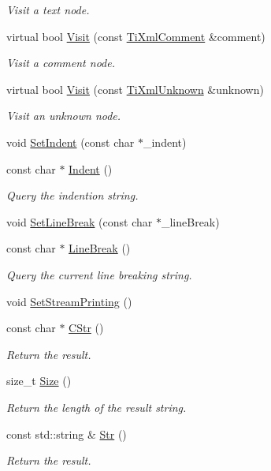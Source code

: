 \begin{DoxyCompactItemize}
\begin{DoxyCompactList}\small\item\em Visit a text node. \end{DoxyCompactList}\item 
virtual bool \hyperlink{class_ti_xml_printer_a9870423f5603630e6142f6bdb66dfb57}{Visit} (const \hyperlink{class_ti_xml_comment}{Ti\-Xml\-Comment} \&comment)
\begin{DoxyCompactList}\small\item\em Visit a comment node. \end{DoxyCompactList}\item 
virtual bool \hyperlink{class_ti_xml_printer_a08591a15c9a07afa83c24e08b03d6358}{Visit} (const \hyperlink{class_ti_xml_unknown}{Ti\-Xml\-Unknown} \&unknown)
\begin{DoxyCompactList}\small\item\em Visit an unknown node. \end{DoxyCompactList}\item 
void \hyperlink{class_ti_xml_printer_a213377a4070c7e625bae59716b089e5e}{Set\-Indent} (const char $\ast$\-\_\-indent)
\item 
const char $\ast$ \hyperlink{class_ti_xml_printer_abb33ec7d4bad6aaeb57f4304394b133d}{Indent} ()
\begin{DoxyCompactList}\small\item\em Query the indention string. \end{DoxyCompactList}\item 
void \hyperlink{class_ti_xml_printer_a4be1e37e69e3858c59635aa947174fe6}{Set\-Line\-Break} (const char $\ast$\-\_\-line\-Break)
\item 
const char $\ast$ \hyperlink{class_ti_xml_printer_a11f1b4804a460b175ec244eb5724d96d}{Line\-Break} ()
\begin{DoxyCompactList}\small\item\em Query the current line breaking string. \end{DoxyCompactList}\item 
void \hyperlink{class_ti_xml_printer_ab23a90629e374cb1cadca090468bbd19}{Set\-Stream\-Printing} ()
\item 
const char $\ast$ \hyperlink{class_ti_xml_printer_a859eede9597d3e0355b77757be48735e}{C\-Str} ()
\begin{DoxyCompactList}\small\item\em Return the result. \end{DoxyCompactList}\item 
size\-\_\-t \hyperlink{class_ti_xml_printer_ad01375ae9199bd2f48252eaddce3039d}{Size} ()
\begin{DoxyCompactList}\small\item\em Return the length of the result string. \end{DoxyCompactList}\item 
const std\-::string \& \hyperlink{class_ti_xml_printer_a3bd4daf44309b41f5813a833caa0d1c9}{Str} ()
\begin{DoxyCompactList}\small\item\em Return the result. \end{DoxyCompactList}\end{DoxyCompactItemize}


